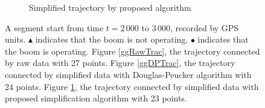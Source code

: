 \begin{figure}
\begin{subfigure}[t]{0.47\textwidth}
\caption{Simplified trajectory by proposed algorithm}\label{ggSPTrac}
\end{subfigure}
\caption{A segment start from time $t=2\,000$ to $3\,000$, recorded by GPS units. $\blacktriangle$ indicates that the boom is not operating. $\bullet$ indicates that the boom is operating. Figure \ref{ggRawTrac}, the trajectory connected by raw data with 27 points. Figure \ref{ggDPTrac}, the trajectory connected by simplified data with Douglas-Peucker algorithm with 24 points. Figure \ref{ggSPTrac}, the trajectory connected by simplified data with proposed simplification algorithm with 23  points.}\label{DataSimpRawTra}
\end{figure}

